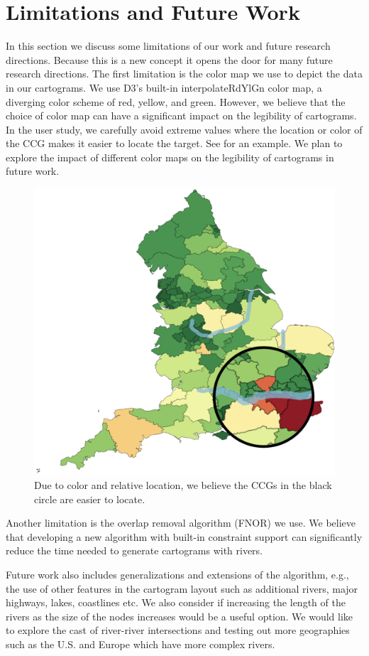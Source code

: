 \section{Limitations and Future Work}

In this section we discuss some limitations of our work and future research directions.
Because this is a new concept it opens the door for many future research directions.
The first limitation is the color map we use to depict the data in our cartograms. 
We use D3's built-in interpolateRdYlGn color map, a diverging color scheme of red, yellow, and green.
However, we believe that the choice of color map can have a significant impact on the legibility of cartograms.
In the user study, we carefully avoid extreme values where the location or color of the CCG makes it easier to locate the target.
See  for an example.
We plan to explore the impact of different color maps on the legibility of cartograms in future work.

{
    \begin{figure}[tb!]
        \centering
        \includegraphics[width=\columnwidth,keepaspectratio]{figure/limitations/extreme.png}
        \caption{Due to color and relative location, we believe the CCGs in the black circle are easier to locate.}
        \label{fig:extreme}
    \end{figure}
}

Another limitation is the overlap removal algorithm (FNOR) we use.
We believe that developing a new algorithm with built-in constraint support can significantly reduce the time needed to generate cartograms with rivers.

Future work also includes generalizations and extensions of the algorithm, e.g., the use of other features in the cartogram layout such as additional rivers, major highways, lakes, coastlines etc.
We also consider if increasing the length of the rivers as the size of the nodes increases would be a useful option.
We would like to explore the cast of river-river intersections and testing out more geographies such as the U.S. and Europe which have more complex rivers.
